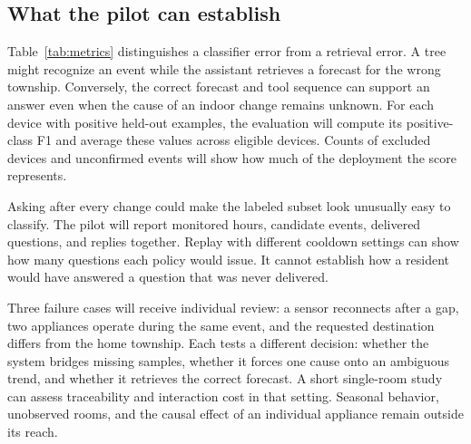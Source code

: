 

\subsection{What the pilot can establish}
Table~\ref{tab:metrics} distinguishes a classifier error from a retrieval error. A tree might recognize an event while the assistant retrieves a forecast for the wrong township. Conversely, the correct forecast and tool sequence can support an answer even when the cause of an indoor change remains unknown. For each device with positive held-out examples, the evaluation will compute its positive-class F1 and average these values across eligible devices. Counts of excluded devices and unconfirmed events will show how much of the deployment the score represents.

Asking after every change could make the labeled subset look unusually easy to classify. The pilot will report monitored hours, candidate events, delivered questions, and replies together. Replay with different cooldown settings can show how many questions each policy would issue. It cannot establish how a resident would have answered a question that was never delivered.

Three failure cases will receive individual review: a sensor reconnects after a gap, two appliances operate during the same event, and the requested destination differs from the home township. Each tests a different decision: whether the system bridges missing samples, whether it forces one cause onto an ambiguous trend, and whether it retrieves the correct forecast. A short single-room study can assess traceability and interaction cost in that setting. Seasonal behavior, unobserved rooms, and the causal effect of an individual appliance remain outside its reach.
